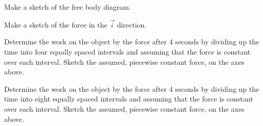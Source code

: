 \begin{problem}
  \begin{subproblem}
    \item Make a sketch of the free body diagram.
      \vspace{4em}
    \item Make a sketch of the force in the $\vec{i}$ direction. \\
      \scalebox{0.5}{}
    \item Determine the work on the object by the force after 4
      seconds by dividing up the time into four equally spaced
      intervals and assuming that the force is constant over each
      interval. Sketch the assumed, piecewise constant force, on the
      axes above.
      \vfill
    \item Determine the work on the object by the force after 4
      seconds by dividing up the time into eight equally spaced
      intervals and assuming that the force is constant over each
      interval. Sketch the assumed, piecewise constant force, on the
      axes above.
      \vfill
  \end{subproblem}

\end{problem}




